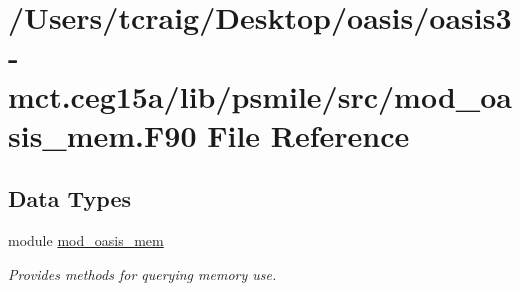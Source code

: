 \hypertarget{mod__oasis__mem_8_f90}{\section{/\+Users/tcraig/\+Desktop/oasis/oasis3-\/mct.ceg15a/lib/psmile/src/mod\+\_\+oasis\+\_\+mem.F90 File Reference}
\label{mod__oasis__mem_8_f90}
}
\subsection*{Data Types}
\begin{DoxyCompactItemize}
\item 
module \hyperlink{classmod__oasis__mem}{mod\+\_\+oasis\+\_\+mem}
\begin{DoxyCompactList}\small\item\em Provides methods for querying memory use. \end{DoxyCompactList}\end{DoxyCompactItemize}
